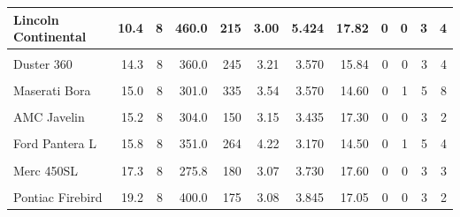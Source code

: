 \documentclass[
]{book}
\begin{document}
\begin{table}[!h]
\begin{tabular}{l|r|r|r|r|r|r|r|r|r|r|r}
\hline
Lincoln Continental & 10.4 & 8 & 460.0 & 215 & 3.00 & 5.424 & 17.82 & 0 & 0 & 3 & 4\\
\hline
\cellcolor{gray!6}{Camaro Z28} & \cellcolor{gray!6}{13.3} & \cellcolor{gray!6}{8} & \cellcolor{gray!6}{350.0} & \cellcolor{gray!6}{245} & \cellcolor{gray!6}{3.73} & \cellcolor{gray!6}{3.840} & \cellcolor{gray!6}{15.41} & \cellcolor{gray!6}{0} & \cellcolor{gray!6}{0} & \cellcolor{gray!6}{3} & \cellcolor{gray!6}{4}\\
\hline
Duster 360 & 14.3 & 8 & 360.0 & 245 & 3.21 & 3.570 & 15.84 & 0 & 0 & 3 & 4\\
\hline
\cellcolor{gray!6}{Chrysler Imperial} & \cellcolor{gray!6}{14.7} & \cellcolor{gray!6}{8} & \cellcolor{gray!6}{440.0} & \cellcolor{gray!6}{230} & \cellcolor{gray!6}{3.23} & \cellcolor{gray!6}{5.345} & \cellcolor{gray!6}{17.42} & \cellcolor{gray!6}{0} & \cellcolor{gray!6}{0} & \cellcolor{gray!6}{3} & \cellcolor{gray!6}{4}\\
\hline
Maserati Bora & 15.0 & 8 & 301.0 & 335 & 3.54 & 3.570 & 14.60 & 0 & 1 & 5 & 8\\
\hline
\cellcolor{gray!6}{Merc 450SLC} & \cellcolor{gray!6}{15.2} & \cellcolor{gray!6}{8} & \cellcolor{gray!6}{275.8} & \cellcolor{gray!6}{180} & \cellcolor{gray!6}{3.07} & \cellcolor{gray!6}{3.780} & \cellcolor{gray!6}{18.00} & \cellcolor{gray!6}{0} & \cellcolor{gray!6}{0} & \cellcolor{gray!6}{3} & \cellcolor{gray!6}{3}\\
\hline
AMC Javelin & 15.2 & 8 & 304.0 & 150 & 3.15 & 3.435 & 17.30 & 0 & 0 & 3 & 2\\
\hline
\cellcolor{gray!6}{Dodge Challenger} & \cellcolor{gray!6}{15.5} & \cellcolor{gray!6}{8} & \cellcolor{gray!6}{318.0} & \cellcolor{gray!6}{150} & \cellcolor{gray!6}{2.76} & \cellcolor{gray!6}{3.520} & \cellcolor{gray!6}{16.87} & \cellcolor{gray!6}{0} & \cellcolor{gray!6}{0} & \cellcolor{gray!6}{3} & \cellcolor{gray!6}{2}\\
\hline
Ford Pantera L & 15.8 & 8 & 351.0 & 264 & 4.22 & 3.170 & 14.50 & 0 & 1 & 5 & 4\\
\hline
\cellcolor{gray!6}{Merc 450SE} & \cellcolor{gray!6}{16.4} & \cellcolor{gray!6}{8} & \cellcolor{gray!6}{275.8} & \cellcolor{gray!6}{180} & \cellcolor{gray!6}{3.07} & \cellcolor{gray!6}{4.070} & \cellcolor{gray!6}{17.40} & \cellcolor{gray!6}{0} & \cellcolor{gray!6}{0} & \cellcolor{gray!6}{3} & \cellcolor{gray!6}{3}\\
\hline
Merc 450SL & 17.3 & 8 & 275.8 & 180 & 3.07 & 3.730 & 17.60 & 0 & 0 & 3 & 3\\
\hline
\cellcolor{gray!6}{Hornet Sportabout} & \cellcolor{gray!6}{18.7} & \cellcolor{gray!6}{8} & \cellcolor{gray!6}{360.0} & \cellcolor{gray!6}{175} & \cellcolor{gray!6}{3.15} & \cellcolor{gray!6}{3.440} & \cellcolor{gray!6}{17.02} & \cellcolor{gray!6}{0} & \cellcolor{gray!6}{0} & \cellcolor{gray!6}{3} & \cellcolor{gray!6}{2}\\
\hline
Pontiac Firebird & 19.2 & 8 & 400.0 & 175 & 3.08 & 3.845 & 17.05 & 0 & 0 & 3 & 2\\
\hline
\end{tabular}
\end{table}
\end{document}
